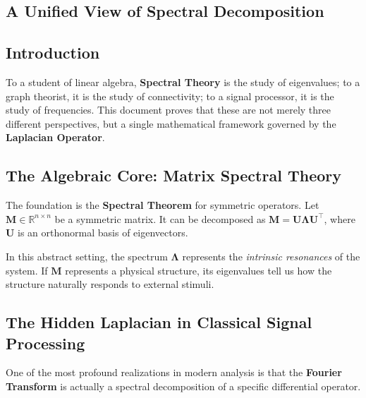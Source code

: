 \begin{notechapter}
\chapter{A Unified View of Spectral Decomposition}\label{ch:spectral-bridge}

\section{Introduction}
To a student of linear algebra, \textbf{Spectral Theory} is the study of eigenvalues; to a graph theorist, it is the study of connectivity; to a signal processor, it is the study of frequencies. This document proves that these are not merely three different perspectives, but a single mathematical framework governed by the \textbf{Laplacian Operator}.

\section{The Algebraic Core: Matrix Spectral Theory}
The foundation is the \textbf{Spectral Theorem} for symmetric operators. Let $\mathbf{M} \in \mathbb{R}^{n \times n}$ be a symmetric matrix. It can be decomposed as $\mathbf{M} = \mathbf{U} \bm{\Lambda} \mathbf{U}^\top$, where $\mathbf{U}$ is an orthonormal basis of eigenvectors. 

In this abstract setting, the spectrum $\bm{\Lambda}$ represents the \textit{intrinsic resonances} of the system. If $\mathbf{M}$ represents a physical structure, its eigenvalues tell us how the structure naturally responds to external stimuli.

\section{The Hidden Laplacian in Classical Signal Processing}
One of the most profound realizations in modern analysis is that the \textbf{Fourier Transform} is actually a spectral decomposition of a specific differential operator.


\end{notechapter}
